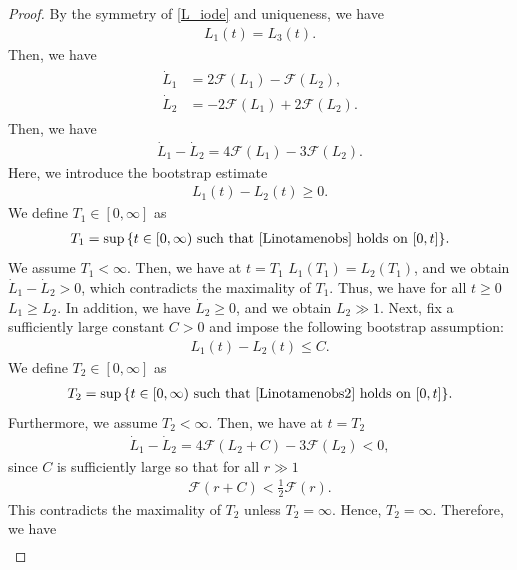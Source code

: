 \documentclass[10pt,a4paper]{amsart}
\numberwithin{equation}{section}
\begin{document}
\begin{proof}
By the symmetry of \eqref{L_iode} and uniqueness, we have
\begin{align*}
L_1(t)=L_3(t).
\end{align*}
Then, we have
\begin{align}\label{L1L2ode}
\begin{aligned}
\dot{L}_1&=2\mathcal{F}(L_1)-\mathcal{F}(L_2),
\\
\dot{L}_2&=-2\mathcal{F}(L_1)+2\mathcal{F}(L_2).
\end{aligned}
\end{align}
Then, we have
\begin{align*}
\dot{L}_1-\dot{L}_2=4\mathcal{F}(L_1)-3\mathcal{F}(L_2).
\end{align*}
Here, we introduce the bootstrap estimate
\begin{align}\label{Linotamenobs}
L_1(t)-L_2(t)\geq 0.
\end{align}
We define $T_1\in [0,\infty]$ as 
\begin{align}\label{LibsnoT1}
T_1=\sup{\{t\in[0,\infty)\ \mbox{such that}\ \eqref{Linotamenobs}\ \mbox{holds on}\ [0,t] \}}.
\end{align}
We assume $T_1<\infty$. Then, we have at $t=T_1$ $L_1(T_1)=L_2(T_1)$, and we obtain $\dot{L}_1-\dot{L}_2>0$, which contradicts the maximality of $T_1$. Thus, we have for all $t\geq 0$ $L_1\geq L_2$. In addition, we have $\dot{L}_2\geq 0$, and we obtain $L_2\gg 1$. Next, fix a sufficiently large constant $C>0$ and impose the following bootstrap assumption:
\begin{align}\label{Linotamenobs2}
L_1(t)-L_2(t)\leq C.
\end{align}
We define $T_2\in [0,\infty]$ as 
\begin{align}\label{LibsnoT2}
T_2=\sup{\{t\in[0,\infty)\ \mbox{such that}\ \eqref{Linotamenobs2}\ \mbox{holds on}\ [0,t] \}}.
\end{align}
Furthermore, we assume $T_2<\infty$. Then, we have at $t=T_2$
\begin{align*}
\dot{L}_1-\dot{L}_2=4\mathcal{F}(L_2+C)-3\mathcal{F}(L_2)<0,
\end{align*}
since $C$ is sufficiently large so that for all $r\gg 1$
\begin{align*}
\mathcal{F}(r+C)<\frac{1}{2}\mathcal{F}(r).
\end{align*}
This contradicts the maximality of $T_2$ unless $T_2=\infty$. Hence, $T_2=\infty$. Therefore, we have
\begin{align}\label{L1L2sasim}

\end{align}
\end{proof}
\end{document}
